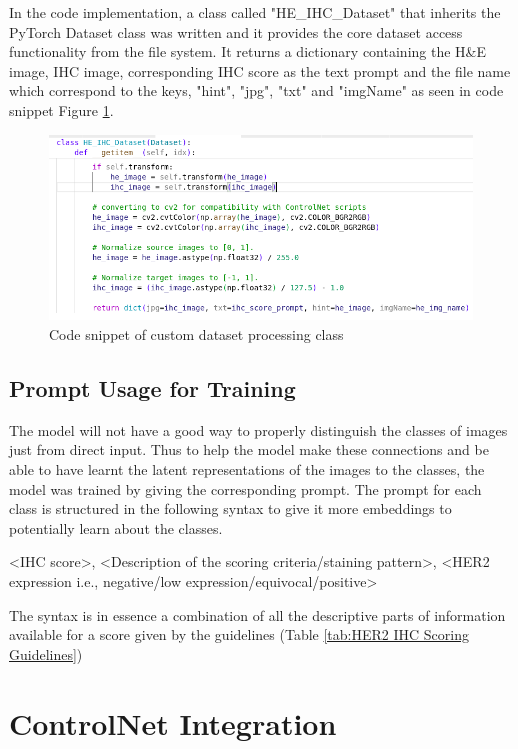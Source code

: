 In the code implementation, a class called "HE\_IHC\_Dataset" that inherits the PyTorch Dataset class was written and it provides the core dataset access functionality from the file system. It returns a dictionary containing the H\&E image, IHC image, corresponding IHC score as the text prompt and the file name which correspond to the keys, "hint", "jpg", "txt" and "imgName" as seen in code snippet Figure \ref{fig:he-ihc-dataset-class}.  
\begin{figure}[ht]
    \centering
    \includegraphics[width=1\linewidth]{4_ResearchMethodology/figures/he_ihc_dataset_class_return_snippet.png}
    \caption[Custom dataset processing class]{Code snippet of custom dataset processing class}
    \label{fig:he-ihc-dataset-class}
\end{figure}
\subsection{Prompt Usage for Training}

The model will not have a good way to properly distinguish the classes of images just from direct input. Thus to help the model make these connections and be able to have learnt the latent representations of the images to the classes, the model was trained by giving the corresponding prompt. The prompt for each class is structured in the following syntax to give it more embeddings to potentially learn about the classes.

<IHC score>, <Description of the scoring criteria/staining pattern>, <HER2 expression i.e., negative/low expression/equivocal/positive>

The syntax is in essence a combination of all the descriptive parts of information available for a score given by the guidelines (Table \ref{tab:HER2 IHC Scoring Guidelines})

\section{ControlNet Integration}

